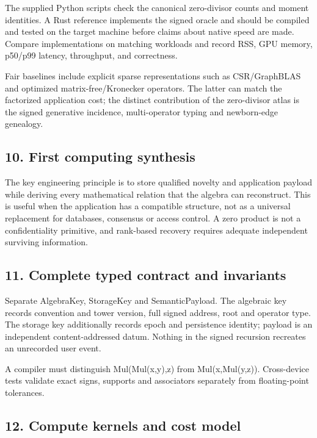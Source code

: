 \documentclass[
  10pt,
]{article}
\begin{document}
The supplied Python scripts check the canonical zero-divisor counts and
moment identities. A Rust reference implements the signed oracle and
should be compiled and tested on the target machine before claims about
native speed are made. Compare implementations on matching workloads and
record RSS, GPU memory, p50/p99 latency, throughput, and correctness.

Fair baselines include explicit sparse representations such as
CSR/GraphBLAS and optimized matrix-free/Kronecker operators. The latter
can match the factorized application cost; the distinct contribution of
the zero-divisor atlas is the signed generative incidence,
multi-operator typing and newborn-edge genealogy.

\subsection{10. First computing
synthesis}\label{first-computing-synthesis}

The key engineering principle is to store qualified novelty and
application payload while deriving every mathematical relation that the
algebra can reconstruct. This is useful when the application has a
compatible structure, not as a universal replacement for databases,
consensus or access control. A zero product is not a confidentiality
primitive, and rank-based recovery requires adequate independent
surviving information.

\subsection{11. Complete typed contract and
invariants}\label{complete-typed-contract-and-invariants}

Separate AlgebraKey, StorageKey and SemanticPayload. The algebraic key
records convention and tower version, full signed address, root and
operator type. The storage key additionally records epoch and
persistence identity; payload is an independent content-addressed datum.
Nothing in the signed recursion recreates an unrecorded user event.

A compiler must distinguish Mul(Mul(x,y),z) from Mul(x,Mul(y,z)).
Cross-device tests validate exact signs, supports and associators
separately from floating-point tolerances.

\subsection{12. Compute kernels and cost
model}\label{compute-kernels-and-cost-model}
\end{document}

